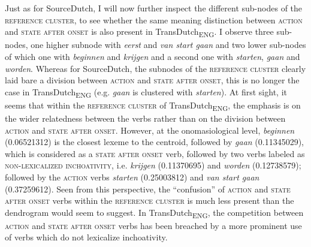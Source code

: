 Just as for SourceDutch, I will now further inspect the different sub-nodes of the \textsc{reference cluster}, to see whether the same meaning distinction between \textsc{action} and \textsc{state after onset} is also present in TransDutch\textsubscript{ENG}. I observe three sub-nodes, one higher subnode with \textit{eerst} and \textit{van start gaan} and two lower sub-nodes of which one with \textit{beginnen} and \textit{krijgen} and a second one with \textit{starten}, \textit{gaan} and \textit{worden}. Whereas for SourceDutch, the subnodes of the \textsc{reference cluster} clearly laid bare a division between \textsc{action} and \textsc{state after onset}, this is no longer the case in TransDutch\textsubscript{ENG} (e.g. \textit{gaan} is clustered with \textit{starten}). At first sight, it seems that within the \textsc{reference cluster} of TransDutch\textsubscript{ENG}, the emphasis is on the wider relatedness between the verbs rather than on the division between \textsc{action} and \textsc{state after onset}. However, at the onomasiological level, \textit{beginnen} (0.06521312) is the closest lexeme to the centroid, followed by \textit{gaan} (0.11345029), which is considered as a \textsc{state after onset} verb, followed by two verbs labeled as {\textsc{non-lexicalized inchoativity}}, i.e. \textit{krijgen} (0.11370695) and \textit{worden} (0.12738579); followed by the \textsc{action} verbs \textit{starten} (0.25003812) and \textit{van start gaan} (0.37259612). Seen from this perspective, the ``confusion'' of \textsc{action} and \textsc{state after onset} verbs within the \textsc{reference cluster} is much less present than the dendrogram would seem to suggest. In TransDutch\textsubscript{ENG}, the competition between \textsc{action} and \textsc{state after onset} verbs has been breached by a more prominent use of verbs which do not lexicalize inchoativity.

